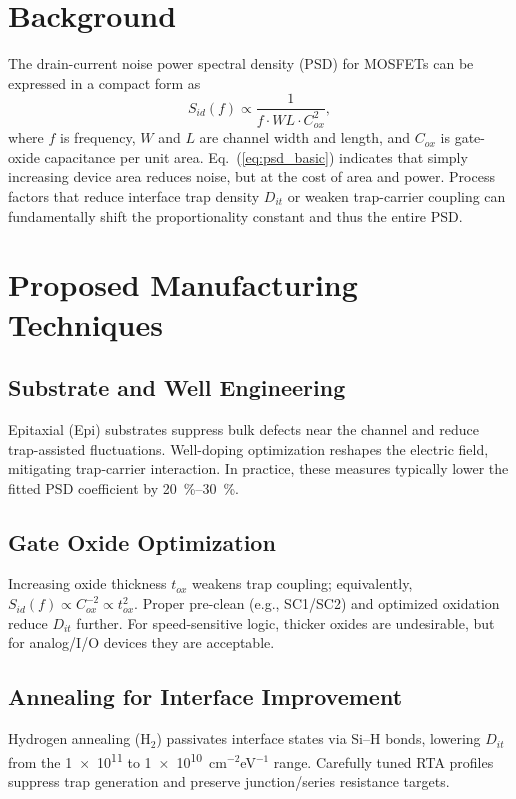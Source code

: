 \documentclass[conference]{IEEEtran}
\begin{document}
\section{Background}
The drain-current noise power spectral density (PSD) for MOSFETs can be expressed in a compact form as
\begin{equation}
S_{id}(f) \propto \frac{1}{f \cdot W L \cdot C_{ox}^{2}},
\label{eq:psd_basic}
\end{equation}
where $f$ is frequency, $W$ and $L$ are channel width and length, and $C_{ox}$ is gate-oxide capacitance per unit area. Eq.~(\ref{eq:psd_basic}) indicates that simply increasing device area reduces noise, but at the cost of area and power. Process factors that reduce interface trap density $D_{it}$ or weaken trap-carrier coupling can fundamentally shift the proportionality constant and thus the entire PSD.

\section{Proposed Manufacturing Techniques}
\subsection{Substrate and Well Engineering}
Epitaxial (Epi) substrates suppress bulk defects near the channel and reduce trap-assisted fluctuations. Well-doping optimization reshapes the electric field, mitigating trap-carrier interaction. In practice, these measures typically lower the fitted PSD coefficient by \SI{20}{\percent}--\SI{30}{\percent}.

\subsection{Gate Oxide Optimization}
Increasing oxide thickness $t_{ox}$ weakens trap coupling; equivalently, $S_{id}(f)\propto C_{ox}^{-2}\propto t_{ox}^{2}$. Proper pre-clean (e.g., SC1/SC2) and optimized oxidation reduce $D_{it}$ further. For speed-sensitive logic, thicker oxides are undesirable, but for analog/I/O devices they are acceptable.

\subsection{Annealing for Interface Improvement}
Hydrogen annealing (H$_2$) passivates interface states via Si--H bonds, lowering $D_{it}$ from the \num{1e11} to \num{1e10}~cm$^{-2}$eV$^{-1}$ range. Carefully tuned RTA profiles suppress trap generation and preserve junction/series resistance targets.
\end{document}

